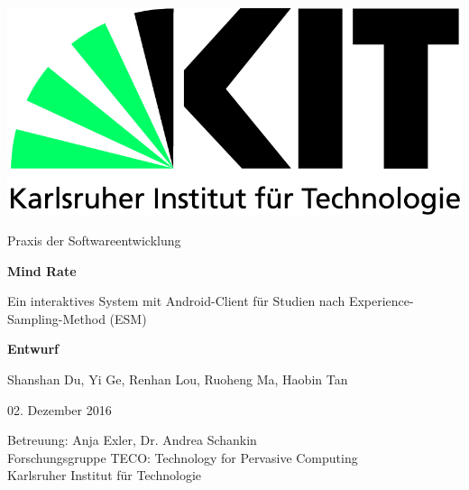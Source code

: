\documentclass[a4paper]{scrreprt}
\begin{document}
    \def\code#1{\texttt{#1}}

    \begin{flushright}
        \includegraphics[scale = 0.7]{kit-logo.jpg}\\[0.5cm]
    \end{flushright}
    \vspace*{2cm}

    \begin{center} \large

        Praxis der Softwareentwicklung
        \vspace * {1.5cm}

        \textbf{\huge Mind Rate}

        \vspace*{1cm}


        {\Large Ein interaktives System mit Android-Client f\"ur Studien nach Experience-Sampling-Method (ESM)}

        \vspace*{1cm}

        \textbf{\Large Entwurf}
        \vspace*{2cm}

        Shanshan Du, Yi Ge, Renhan Lou, Ruoheng Ma, Haobin Tan
        \vspace*{1cm}

        02. Dezember 2016
        \vspace*{2.5cm}

        Betreuung: Anja Exler, Dr. Andrea Schankin\\[0.5cm]
        Forschungsgruppe TECO: Technology for Pervasive Computing\\[0.5cm]

        Karlsruher Institut für Technologie
    \end{center}
    \thispagestyle{empty}
\end{document}

